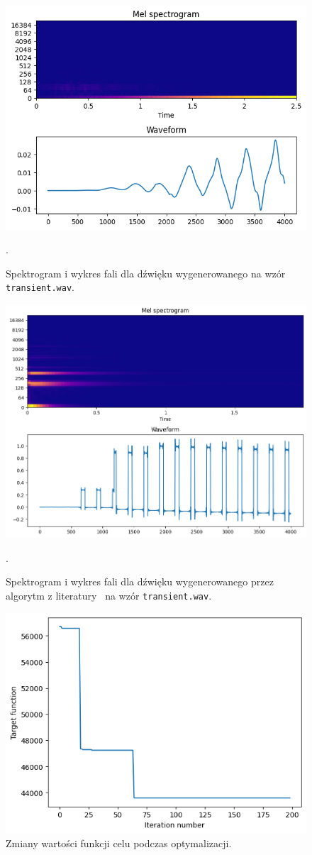 \begin{figure}[H]
    \centering
    \includegraphics[width=0.7\linewidth]{rys06/evolved_sample_transient.png}
    \caption{
      Spektrogram i wykres fali dla dźwięku wygenerowanego na wzór
      \texttt{transient.wav}.
    }\label{fig:evolved_transient_sound_overview}.
\end{figure}

\begin{figure}[H]
    \centering
    \includegraphics[width=0.7\linewidth]{rys06/macret_evolved_transient.png}
    \caption{
      Spektrogram i wykres fali dla dźwięku wygenerowanego 
      przez algorytm z literatury~\cite{evolutionary_puredata} na wzór
      \texttt{transient.wav}.
    }\label{fig:evolved_literature_transient_sound_overview}.
\end{figure}

\begin{figure}[H]
    \centering
    \includegraphics[width=0.6\linewidth]{rys06/transient_target_fun_values.png}
    \caption{
      Zmiany wartości funkcji celu podczas optymalizacji.
    }\label{fig:transient_target_fun_values}
\end{figure}


